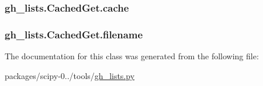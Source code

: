 \subsubsection[{cache}]{\setlength{\rightskip}{0pt plus 5cm}gh\+\_\+lists.\+Cached\+Get.\+cache}\label{classgh__lists_1_1CachedGet_acf60579943447e604e86f7911a721660}
\hypertarget{classgh__lists_1_1CachedGet_ae04bf6cc7ff9ea710d3e842eb1e4dadf}{}
\subsubsection[{filename}]{\setlength{\rightskip}{0pt plus 5cm}gh\+\_\+lists.\+Cached\+Get.\+filename}\label{classgh__lists_1_1CachedGet_ae04bf6cc7ff9ea710d3e842eb1e4dadf}


The documentation for this class was generated from the following file\+:\begin{DoxyCompactItemize}
\item 
packages/scipy-\/0../tools/\hyperlink{gh__lists_8py}{gh\+\_\+lists.\+py}\end{DoxyCompactItemize}
